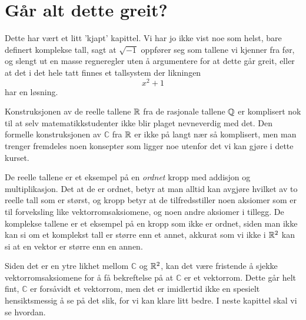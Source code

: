 \section*{Går alt dette greit?}
Dette har vært et litt 'kjapt' kapittel. Vi har jo ikke vist noe som helst, bare definert komplekse tall, sagt at $\sqrt{-1}$ oppfører seg som tallene vi kjenner fra før, og slengt ut en masse regneregler uten å argumentere for at dette går greit, eller at det i det hele tatt finnes et tallsystem der likningen
\[
x^2+1
\]
har en løsning. 

Konstruksjonen av de reelle tallene $\mathbb{R}$ fra de rasjonale tallene $\mathbb{Q}$ er komplisert nok til at selv matematikkstudenter ikke blir plaget nevneverdig med det. Den formelle konstruksjonen av $\mathbb C$ fra $\mathbb{R}$ er ikke på langt nær så komplisert, men man trenger fremdeles noen konsepter som ligger noe utenfor det vi kan gjøre i dette kurset.

De reelle tallene er et eksempel på en \emph{ordnet} kropp med addisjon og multiplikasjon. Det at de er ordnet, betyr at man alltid kan avgjøre hvilket av to reelle tall som er størst, og kropp betyr at de tilfredsstiller noen aksiomer som er til forveksling like vektorromsaksiomene, og noen andre aksiomer i tillegg. De komplekse tallene er et eksempel på en kropp som ikke er ordnet, siden man ikke kan si om et komplekst tall er større enn et annet, akkurat som vi ikke i $\mathbb{R}^2$ kan si at en vektor er større enn en annen.

Siden det er en ytre likhet mellom $\mathbb C$ og $\mathbb{R}^2$, kan det være fristende å sjekke vektorromsaksiomene for å få bekreftelse på at $\mathbb C$ er et vektorrom. Dette går helt fint, $\mathbb C$ er forsåvidt et vektorrom, men det er imidlertid ikke en spesielt hensiktsmessig å se på det slik, for vi kan klare litt bedre. I neste kapittel skal vi se hvordan.


\kapittelslutt
